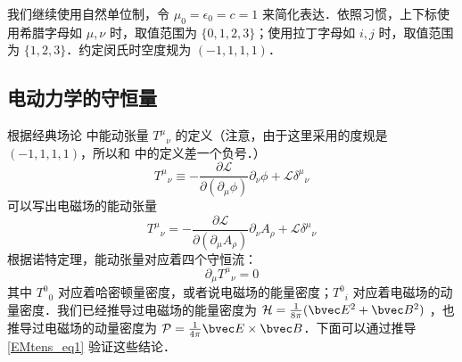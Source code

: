 

我们继续使用自然单位制，令 $\mu_0=\epsilon_0=c=1$ 来简化表达．依照习惯，上下标使用希腊字母如 $\mu, \nu$ 时，取值范围为 $\{0, 1, 2, 3\}$；使用拉丁字母如 $i, j$ 时，取值范围为 $\{1, 2, 3\}$．约定闵氏时空度规为 $(-1,1,1,1)$．

\subsection{电动力学的守恒量}
根据经典场论 中能动张量 ${T^\mu}_\nu$ 的定义（注意，由于这里采用的度规是 $(-1,1,1,1)$，所以和  中的定义差一个负号．）
\begin{equation}
T^\mu{}_\nu \equiv -\frac{\partial \mathcal L}{\partial (\partial_\mu \phi)} \partial_\nu \phi + \mathcal L \delta^\mu{}_\nu
\end{equation}
可以写出电磁场的能动张量
\begin{equation}\label{EMtens_eq1}
T^\mu{}_\nu =-\frac{\partial \mathcal L}{\partial (\partial_\mu A_\rho)} \partial_\nu A_\rho + \mathcal L \delta^\mu{}_\nu
\end{equation}
根据诺特定理，能动张量对应着四个守恒流：
\begin{equation}
\partial_\mu T^\mu{}_\nu=0
\end{equation}
其中 $T^0{}_0$ 对应着哈密顿量密度，或者说电磁场的能量密度；$T^0{}_i$ 对应着电磁场的动量密度．我们已经推导过电磁场的能量密度为 $\mathcal H=\frac{1}{8\pi}(\bvec E^2+\bvec B^2)$ ，也推导过电磁场的动量密度为 $\mathcal P=\frac{1}{4\pi} \bvec E\times \bvec B$．下面可以通过推导 \autoref{EMtens_eq1} 验证这些结论．

